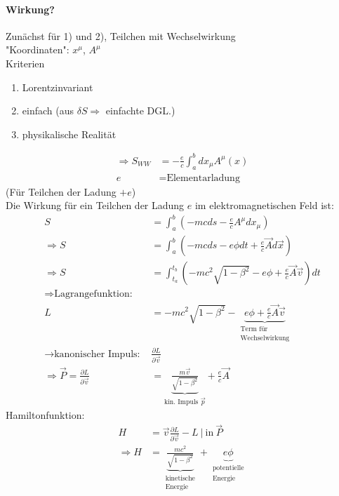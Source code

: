 \documentclass[a4paper]{article}
\begin{document}
\paragraph{Wirkung?\newline}
Zunächst für 1) und 2), Teilchen mit Wechselwirkung\\
"Koordinaten": $x^\mu$, $A^\mu$\\
Kriterien
\begin{enumerate}
  \item Lorentzinvariant
  \item einfach (aus $\delta\!S \Rightarrow$ einfachte DGL.)
  \item physikalische Realität
\end{enumerate}
\begin{align}
  \Rightarrow S_{WW}&=-\frac{e}{c}\int_a^b dx_\mu A^\mu(x)\\
  e&=\text{Elementarladung}
\end{align}
(Für Teilchen der Ladung $+e$)\\
Die Wirkung für ein Teilchen der Ladung $e$ im elektromagnetischen Feld ist:
\begin{align}
S&=\int^b_a\left(-mcds-\frac{e}{c}A^\mu dx_\mu\right)\\
\Rightarrow S&=\int^b_a\left(-mcds-e\phi dt +\frac{e}{c}\vec{A}d\vec{x}\right)\\
\Rightarrow S&=\int^{t_b}_{t_a}\left(-mc^2\sqrt{1-\beta^2}-e\phi
+\frac{e}{c}\vec{A}\vec{v}\right) dt\\
\nonumber\Rightarrow \text{Lagrangefunktion:}&\\
L&=-mc^2\sqrt{1-\beta^2}-\underbrace{e\phi+\frac{e}{c}\vec{A}\vec{v}}_{\substack{\text{Term
für}\\\text{Wechselwirkung}}}\\
\rightarrow \text{kanonischer Impuls: } &\frac{\partial L}{\partial \vec{v}}\\
\Rightarrow \vec{P}=\frac{\partial L}{\partial
\vec{v}}&=\underbrace{\frac{m\vec{v}}{\sqrt{1-\beta^2}}}_{\text{kin. Impuls }
\vec{p}}+\frac{e}{c}\vec{A}
\end{align} 
Hamiltonfunktion:
\begin{align}
H&=\vec{v}\frac{\partial L}{\partial \vec{v}}-L\ |\ \text{in}\ \vec{P}\\
\Rightarrow
H&=\underbrace{\frac{mc^2}{\sqrt{1-\beta^2}}}_{\substack{\text{kinetische}\\
\text{Energie}}}+ \underbrace{e\phi}_{\substack{\text{potentielle}\\
\text{Energie}}}
\end{align}
\end{document}
